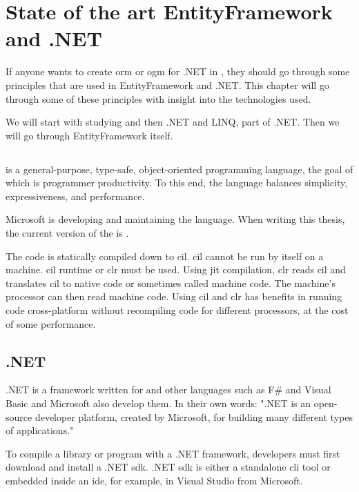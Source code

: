 \chapter {State of the art EntityFramework and .NET}

If anyone wants to create \acrshort{orm} or \acrshort{ogm} for .NET in \CS, they should go through some principles that are used in
EntityFramework and .NET. This chapter will go through some of these principles with insight into the technologies used.

We will start with studying \CS and then .NET and LINQ, part of .NET. Then we will go through EntityFramework itself.

\section {\CS}
\CS is a general-purpose, type-safe, object-oriented programming language, the goal of which is programmer productivity.
To this end, the language balances simplicity, expressiveness,
and performance. \cite{albahari_c_2019}

Microsoft is developing and maintaining the \CS language. When writing this thesis, the current version of the \CS is .

The \CS code is statically compiled down to \acrlong{cil}. \acrshort{cil} cannot be run by itself on a machine.
\acrshort{cil} runtime or \acrfull{clr} must be used. Using \acrfull{jit} compilation, \acrshort{clr} reads \acrshort{cil} and translates \acrshort{cil} to native
code or sometimes called machine code. The machine's processor can then read machine code. Using \acrshort{cil} and \acrshort{clr} has benefits in running code
cross-platform without recompiling code for different processors, at the cost of some performance. \cite{rodenburg_code_2021}

\section {.NET}

.NET is a framework written for \CS and other languages such as F\# and
Visual Basic and Microsoft also develop them.
In their own words: ".NET is an open-source developer
platform, created by Microsoft, for building many different types of applications." \cite{noauthor_what_nodate-2}

To compile a library or program with a .NET framework,
developers must first download and install a .NET \acrfull{sdk}.
.NET \acrfull{sdk} is either a standalone \acrfull{cli} tool or embedded inside an \acrshort{ide},
for example, in Visual Studio from Microsoft.

